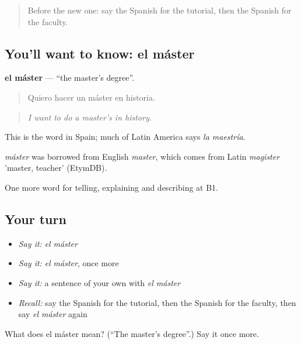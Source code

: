 \label{lesson:ES-C596-master}



\begin{quote}
Before the new one: say the Spanish for the tutorial, then the Spanish for the faculty.
\end{quote}

\subsection*{You'll want to know: el máster}
\textbf{el máster} — \textquotedblleft{}the master's degree\textquotedblright{}.

\begin{quote}
Quiero hacer un máster en historia.
\end{quote}

\begin{quote}
\emph{I want to do a master's in history.}
\end{quote}

This is the word in Spain; much of Latin America says \emph{la maestría}.

\begin{cousinweb}
\emph{máster} was borrowed from English \emph{master}, which comes from Latin \emph{magister} 'master, teacher' (EtymDB).
\end{cousinweb}

\begin{grammarlens}[title={What you've built}]
One more word for telling, explaining and describing at B1.
\end{grammarlens}

\subsection*{Your turn}
\begin{itemize}
\raggedright
  \item \emph{Say it:} \emph{el máster}
  \item \emph{Say it:} \emph{el máster}, once more
  \item \emph{Say it:} a sentence of your own with \emph{el máster}
  \item \emph{Recall:} say the Spanish for the tutorial, then the Spanish for the faculty, then say \emph{el máster} again
\end{itemize}

\begin{tcolorbox}[breakable,colback=teal!4,colframe=teal!35!black,title={Before you move on}]
What does el máster mean? (\textquotedblleft{}The master's degree\textquotedblright{}.) Say it once more.
\end{tcolorbox}
